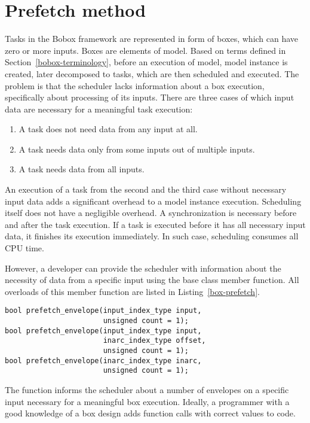 \chapter{Prefetch method}
\label{prefetch}
Tasks in the Bobox framework are represented in form of boxes, which can have zero or more inputs. Boxes are elements of model. Based on terms defined in Section~\ref{bobox-terminology}, before an execution of model, model instance is created, later decomposed to tasks, which are then scheduled and executed. The problem is that the scheduler lacks information about a box execution, specifically about processing of its inputs. There are three cases of which input data are necessary for a meaningful task execution:

\begin{enumerate}
\item A task does not need data from any input at all.
\item A task needs data only from some inputs out of multiple inputs.
\item A task needs data from all inputs.
\end{enumerate}

An execution of a task from the second and the third case without necessary input data adds a significant overhead to a model instance execution. Scheduling itself does not have a negligible overhead. A synchronization is necessary before and after the task execution. If a task is executed before it has all necessary input data, it finishes its execution immediately. In such case, scheduling consumes all CPU time.

However, a developer can provide the scheduler with information about the necessity of data from a specific input using the  base class member function. All overloads of this member function are listed in Listing~\ref{box-prefetch}.

\begin{lstlisting}[caption={\code{basic\_box} prefetch member function overloads.},label={box-prefetch}]
bool prefetch_envelope(input_index_type input,
                       unsigned count = 1);
bool prefetch_envelope(input_index_type input,
                       inarc_index_type offset,
                       unsigned count = 1);
bool prefetch_envelope(inarc_index_type inarc,
                       unsigned count = 1);
\end{lstlisting}

The function informs the scheduler about a number of envelopes on a specific input necessary for a meaningful box execution. Ideally, a programmer with a good knowledge of a box design adds function calls with correct values to code.

